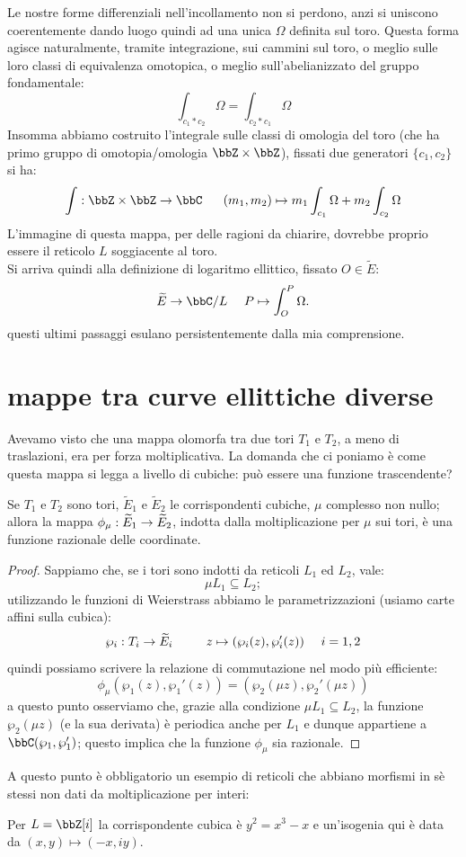 Le nostre forme differenziali nell'incollamento non si perdono, anzi si uniscono coerentemente dando luogo quindi ad una unica $\Omega$ definita sul toro.
Questa forma agisce naturalmente, tramite integrazione, sui cammini sul toro, o meglio sulle loro classi di equivalenza omotopica, o meglio sull'abelianizzato del gruppo fondamentale:
$$
\int_{c_1 * c_2} \Omega=\int_{c_2 * c_1} \Omega
$$ 
Insomma abbiamo costruito l'integrale sulle classi di omologia del toro (che ha primo gruppo di omotopia/omologia $\bbZ \times \bbZ $), fissati due generatori $\{c_1,c_2\}$ si ha:
$$
\int: \bbZ\times \bbZ \rar \bbC \ \ \ \ \ (m_1,m_2)\mapsto m_1 \int_{c_1} \Omega+m_2 \int_{c_2} \Omega  
$$
L'immagine di questa mappa, per delle ragioni da chiarire, dovrebbe proprio essere il reticolo $L$ soggiacente al toro.\\
Si arriva quindi alla definizione di logaritmo ellittico, fissato $O\in \widetilde{E}$:
$$
\widetilde{E}\rar \bbC/L\ \ \ \ P\mapsto \int_O^P \Omega.
$$
questi ultimi passaggi esulano persistentemente dalla mia comprensione.


\section{mappe tra curve ellittiche diverse}
Avevamo visto che una mappa olomorfa tra due tori $T_1$ e $T_2$, a meno di traslazioni, era per forza moltiplicativa. La domanda che ci poniamo è come questa mappa si legga a livello di cubiche: può essere una funzione trascendente?
\begin{proposizione}
Se $T_1$ e $T_2$ sono tori, $\widetilde{E}_1$ e $\widetilde{E}_2$ le corrispondenti cubiche, $\mu$ complesso non nullo; allora la mappa $\phi_\mu:\widetilde{E}_1\rightarrow\widetilde{E}_2$, indotta dalla moltiplicazione per $\mu$ sui tori, è una funzione razionale delle coordinate.
\end{proposizione}
\begin{proof}
Sappiamo che, se i tori sono indotti da reticoli $L_1$ ed $L_2$, vale:
$$
\mu L_1\subseteq L_2;
$$
utilizzando le funzioni di Weierstrass abbiamo le parametrizzazioni (usiamo carte affini sulla cubica):
$$
\wp_i:T_i\rightarrow \widetilde{E}_i \qquad \ \ z \mapsto (\wp_i(z),\wp_i'(z))\ \ \ \ i=1,2
$$
quindi possiamo scrivere la relazione di commutazione nel modo più efficiente:
$$
\phi_\mu(\wp_1(z),\wp_1'(z))=(\wp_2(\mu z),\wp_2'(\mu z))
$$
a questo punto osserviamo che, grazie alla condizione $\mu L_1\subseteq L_2$, la funzione $\wp_2(\mu z)$ (e la sua derivata) è periodica anche per $L_1$ e dunque appartiene a $\bbC(\wp_1,\wp_1')$; questo implica che la funzione $\phi_\mu$ sia razionale.
\end{proof}
A questo punto è obbligatorio un esempio di reticoli che abbiano morfismi in sè stessi non dati da moltiplicazione per interi:
\begin{fatto}
Per $L=\bbZ[i]$ la corrispondente cubica è $y^2=x^3-x$ e un'isogenia qui è data da $(x,y)\mapsto (-x,iy)$.
\end{fatto}
